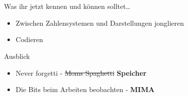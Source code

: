 \section{}
	\begin{frame}{Was ihr jetzt kennen und können solltet\dots}
			\begin{itemize}
				\item Zwischen Zahlensystemen und Darstellungen jonglieren
				\item Codieren
			\end{itemize}
	
	\end{frame}
	\begin{frame}{Ausblick}
		\begin{itemize}
			\item Never forgetti - \sout{Moms Spaghetti} \textbf{Speicher}
			\item Die Bits beim Arbeiten beobachten - \textbf{MIMA}
		\end{itemize}
	\end{frame}
\section{}
\questionframe
\lastframe
{}

